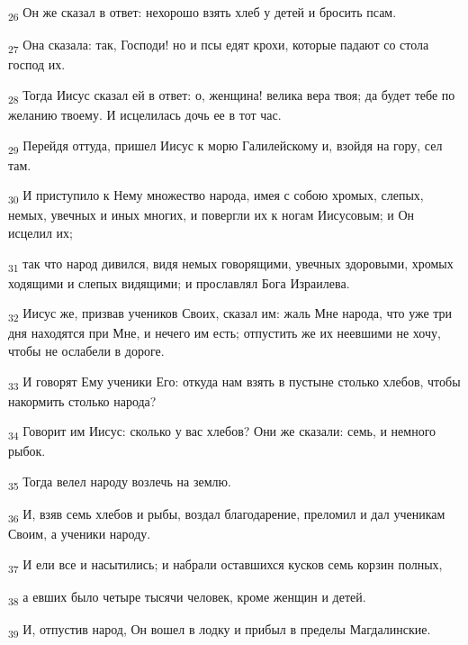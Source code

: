 \begin{tcolorbox}
\textsubscript{26} Он же сказал в ответ: нехорошо взять хлеб у детей и бросить псам.
\end{tcolorbox}
\begin{tcolorbox}
\textsubscript{27} Она сказала: так, Господи! но и псы едят крохи, которые падают со стола господ их.
\end{tcolorbox}
\begin{tcolorbox}
\textsubscript{28} Тогда Иисус сказал ей в ответ: о, женщина! велика вера твоя; да будет тебе по желанию твоему. И исцелилась дочь ее в тот час.
\end{tcolorbox}
\begin{tcolorbox}
\textsubscript{29} Перейдя оттуда, пришел Иисус к морю Галилейскому и, взойдя на гору, сел там.
\end{tcolorbox}
\begin{tcolorbox}
\textsubscript{30} И приступило к Нему множество народа, имея с собою хромых, слепых, немых, увечных и иных многих, и повергли их к ногам Иисусовым; и Он исцелил их;
\end{tcolorbox}
\begin{tcolorbox}
\textsubscript{31} так что народ дивился, видя немых говорящими, увечных здоровыми, хромых ходящими и слепых видящими; и прославлял Бога Израилева.
\end{tcolorbox}
\begin{tcolorbox}
\textsubscript{32} Иисус же, призвав учеников Своих, сказал им: жаль Мне народа, что уже три дня находятся при Мне, и нечего им есть; отпустить же их неевшими не хочу, чтобы не ослабели в дороге.
\end{tcolorbox}
\begin{tcolorbox}
\textsubscript{33} И говорят Ему ученики Его: откуда нам взять в пустыне столько хлебов, чтобы накормить столько народа?
\end{tcolorbox}
\begin{tcolorbox}
\textsubscript{34} Говорит им Иисус: сколько у вас хлебов? Они же сказали: семь, и немного рыбок.
\end{tcolorbox}
\begin{tcolorbox}
\textsubscript{35} Тогда велел народу возлечь на землю.
\end{tcolorbox}
\begin{tcolorbox}
\textsubscript{36} И, взяв семь хлебов и рыбы, воздал благодарение, преломил и дал ученикам Своим, а ученики народу.
\end{tcolorbox}
\begin{tcolorbox}
\textsubscript{37} И ели все и насытились; и набрали оставшихся кусков семь корзин полных,
\end{tcolorbox}
\begin{tcolorbox}
\textsubscript{38} а евших было четыре тысячи человек, кроме женщин и детей.
\end{tcolorbox}
\begin{tcolorbox}
\textsubscript{39} И, отпустив народ, Он вошел в лодку и прибыл в пределы Магдалинские.
\end{tcolorbox}
